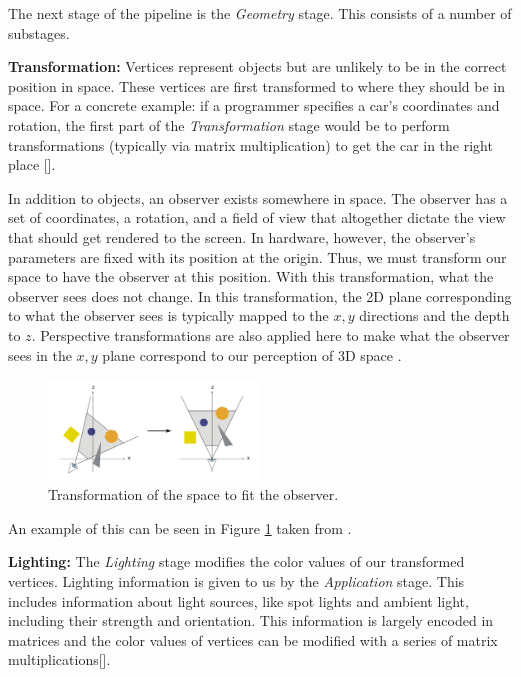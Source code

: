 The next stage of the pipeline is the \textit{Geometry} stage. 
This consists of a number of substages.

\textbf{Transformation:}
Vertices represent objects but are unlikely to be in the correct position in space.
These vertices are first transformed to where they should be in space.
For a concrete example: if a programmer specifies a car's coordinates and
rotation, the first part of the \textit{Transformation} stage would be to perform
transformations (typically via matrix multiplication) to get the car in the
right place [\cite{nvidia256}].

In addition to objects, an observer exists somewhere in space.
The observer has a set of coordinates, a rotation, and a field of view that altogether dictate the view that should get rendered to the screen.
In hardware, however, the observer's parameters are fixed with its position at the origin.
Thus, we must transform our space to have the observer at this position.
With this transformation, what the observer sees does not change.
In this transformation, the 2D plane corresponding to what the observer
sees is typically mapped to the $x,y$ directions and the depth to $z$.
Perspective transformations are also applied here to make what the observer sees in the $x,y$ plane correspond to our perception of 3D space \cite{agoston2005transformations}.

\begin{figure}[h]
    \centering
    \includegraphics[width=0.5\textwidth]{assets/View_transform.svg.png}
    \caption{Transformation of the space to fit the observer.}
    \label{fig:transform}
\end{figure}

An example of this can be seen in Figure \ref{fig:transform} taken from \cite{wiki:Graphics_pipeline}.

\textbf{Lighting:}
The \textit{Lighting} stage modifies the color values of our transformed vertices.
Lighting information is given to us by the \textit{Application} stage.
This includes information about light sources, like spot lights and ambient
light, including their strength and orientation.
This information is largely encoded in matrices and the color values of
vertices can be modified with a series of matrix multiplications[\cite{nvidia256}].

